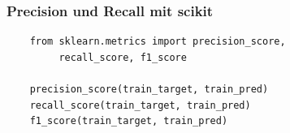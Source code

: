 

\begin{frame}[fragile]
  \frametitle{Precision und Recall mit scikit}

  \begin{verbatim}
    from sklearn.metrics import precision_score,
         recall_score, f1_score

    precision_score(train_target, train_pred)
    recall_score(train_target, train_pred)
    f1_score(train_target, train_pred)
  \end{verbatim}
\end{frame}


